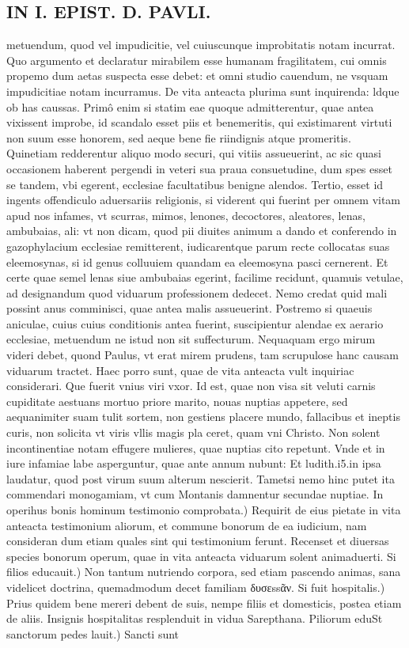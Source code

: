 \documentclass{article}
\begin{document}
\begin{pages}
\section*{IN I. EPIST. D. PAVLI. }
\marginpar{[ p.108 ]}\pstart metuendum, quod vel impudicitie, vel cuiuscunque improbitatis notam incurrat. Quo argumento et declaratur mirabilem esse humanam fragilitatem, cui omnis propemo dum aetas suspecta esse debet: et omni studio cauendum, ne vsquam impudicitiae notam incurramus. De vita anteacta plurima sunt inquirenda: ldque ob has caussas. Primô enim si statim eae quoque admitterentur, quae antea vixissent improbe, id scandalo esset piis et benemeritis, qui existimarent virtuti non suum esse honorem, sed aeque bene fie riindignis atque promeritis. Quinetiam redderentur aliquo modo securi, qui vitiis assueuerint, ac sic quasi occasionem haberent pergendi in veteri sua praua consuetudine, dum spes esset se tandem, vbi egerent, ecclesiae facultatibus benigne alendos. Tertio, esset id ingents offendiculo aduersariis religionis, si viderent qui fuerint per omnem vitam apud nos infames, vt scurras, mimos, lenones, decoctores, aleatores, lenas, ambubaias, ali: vt non dicam, quod pii diuites animum a dando et conferendo in gazophylacium ecclesiae remitterent, iudicarentque parum recte collocatas suas eleemosynas, si id genus colluuiem quandam ea eleemosyna pasci cernerent. Et certe quae semel lenas siue ambubaias egerint, facilime recidunt, quamuis vetulae, ad designandum quod viduarum professionem dedecet. Nemo credat quid mali possint anus comminisci, quae antea malis assueuerint. Postremo si quaeuis aniculae, cuius cuius conditionis antea fuerint, suscipientur alendae ex aerario ecclesiae, metuendum ne istud non sit suffecturum. Nequaquam ergo mirum videri debet, quond Paulus, vt erat mirem prudens, tam scrupulose hanc causam viduarum tractet. Haec porro sunt, quae de vita anteacta vult inquiriac considerari.  \pend\pstart Que fuerit vnius viri vxor. Id est, quae non visa sit veluti carnis cupiditate aestuans mortuo priore marito, nouas nuptias appetere, sed aequanimiter suam tulit sortem, non gestiens placere mundo, fallacibus et ineptis curis, non solicita vt viris vllis magis pla ceret, quam vni Christo. Non solent incontinentiae notam effugere mulieres, quae nuptias cito repetunt. Vnde et in iure infamiae labe asperguntur, quae ante annum nubunt: Et ludith.i5.in ipsa laudatur, quod post virum suum alterum nescierit. Tametsi nemo hinc putet ita commendari monogamiam, vt cum Montanis damnentur secundae nuptiae.  \pend\pstart In operihus bonis hominum testimonio comprobata.) Requirit de eius pietate in vita anteacta testimonium aliorum, et commune bonorum de ea iudicium, nam consideran dum etiam quales sint qui testimonium ferunt. Recenset et diuersas species bonorum operum, quae in vita anteacta viduarum solent animaduerti.  \pend\pstart Si filios educauit.) Non tantum nutriendo corpora, sed etiam pascendo animas, sana videlicet doctrina, quemadmodum decet familiam δυσεssᾶν.  \pend\pstart Si fuit hospitalis.) Prius quidem bene mereri debent de suis, nempe filiis et domesticis, postea etiam de aliis. Insignis hospitalitas resplenduit in vidua Sarepthana.  \pend\pstart Piliorum eduSt sanctorum pedes lauit.) Sancti sunt 
\end{pages}
\end{document}
